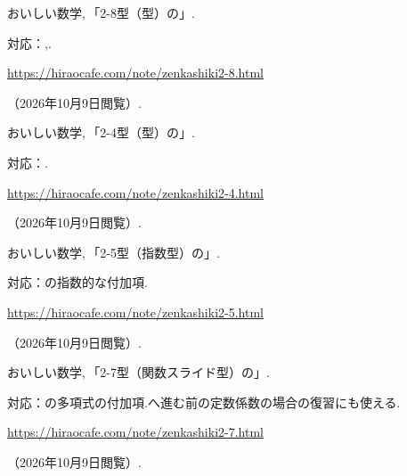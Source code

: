 \begin{enumerate}[resume,label={[\arabic*]}]
    \item \begin{minipage}[t]{\linewidth}\raggedright
        おいしい数学,\,「2-8型（型）の」.
        \par{\small 対応：,.\par}
        \par\noindent\url{https://hiraocafe.com/note/zenkashiki2-8.html}\par
        \noindent（2026年10月9日閲覧）.
      \end{minipage}\par\smallskip

    \item \begin{minipage}[t]{\linewidth}\raggedright
        おいしい数学,\,「2-4型（型）の」.
        \par{\small 対応：.\par}
        \par\noindent\url{https://hiraocafe.com/note/zenkashiki2-4.html}\par
        \noindent（2026年10月9日閲覧）.
      \end{minipage}\par\smallskip

    \item \begin{minipage}[t]{\linewidth}\raggedright
        おいしい数学,\,「2-5型（指数型）の」.
        \par{\small 対応：の指数的な付加項.\par}
        \par\noindent\url{https://hiraocafe.com/note/zenkashiki2-5.html}\par
        \noindent（2026年10月9日閲覧）.
      \end{minipage}\par\smallskip

    \item \begin{minipage}[t]{\linewidth}\raggedright
        おいしい数学,\,「2-7型（関数スライド型）の」.
        \par{\small 対応：の多項式の付加項.へ進む前の定数係数の場合の復習にも使える.\par}
        \par\noindent\url{https://hiraocafe.com/note/zenkashiki2-7.html}\par
        \noindent（2026年10月9日閲覧）.
      \end{minipage}\par\smallskip


\end{enumerate}
